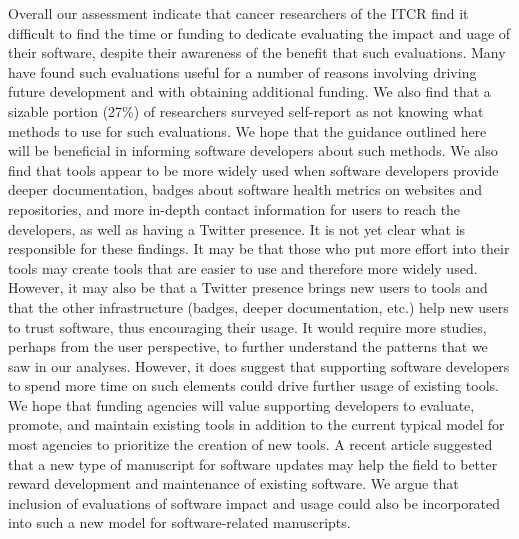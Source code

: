 \documentclass{article}
\begin{document}
Overall our assessment indicate that cancer researchers of the ITCR find it difficult to find the time or funding to dedicate evaluating the impact and uage of their software, despite their awareness of the benefit that such evaluations. Many have found such evaluations useful for a number of reasons involving driving future development and with obtaining additional funding. We also find that a sizable portion (27\%) of researchers surveyed self-report as not knowing what methods to use for such evaluations. We hope that the guidance outlined here will be beneficial in informing software developers about such methods.  We also find that tools appear to be more widely used when software developers provide deeper documentation, badges about software health metrics on websites and repositories, and more in-depth contact information for users to reach the developers, as well as having a Twitter presence. It is not yet clear what is responsible for these findings. It may be that those who put more effort into their tools may create tools that are easier to use and therefore more widely used. However, it may also be that a Twitter presence brings new users to tools and that the other infrastructure (badges, deeper documentation, etc.) help new users to trust software, thus encouraging their usage. It would require more studies, perhaps from the user perspective, to further understand the patterns that we saw in our analyses. However, it does suggest that supporting software developers to spend more time on such elements could drive further usage of existing tools. We hope that funding agencies will value supporting developers to evaluate, promote, and maintain existing tools in addition to the current typical model for most agencies to prioritize the creation of new tools. A recent article \cite{merow_better_2023} suggested that a new type of manuscript for software updates may help the field to better reward development and maintenance of existing software. We argue that inclusion of evaluations of software impact and usage could also be incorporated into such a new model for software-related manuscripts. 
\end{document}

